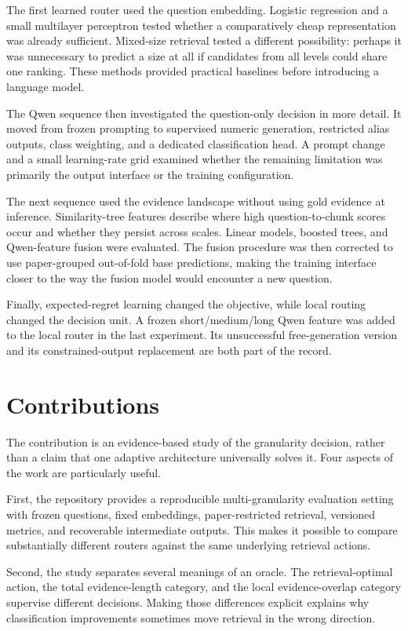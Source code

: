 The first learned router used the question embedding. Logistic regression
and a small multilayer perceptron tested whether a comparatively cheap
representation was already sufficient. Mixed-size retrieval tested a
different possibility: perhaps it was unnecessary to predict a size at
all if candidates from all levels could share one ranking. These methods
provided practical baselines before introducing a language model.

The Qwen sequence then investigated the question-only decision in more
detail. It moved from frozen prompting to supervised numeric generation,
restricted alias outputs, class weighting, and a dedicated classification
head. A prompt change and a small learning-rate grid examined whether
the remaining limitation was primarily the output interface or the
training configuration.

The next sequence used the evidence landscape without using gold
evidence at inference. Similarity-tree features describe where high
question-to-chunk scores occur and whether they persist across scales.
Linear models, boosted trees, and Qwen-feature fusion were evaluated.
The fusion procedure was then corrected to use paper-grouped out-of-fold
base predictions, making the training interface closer to the way the
fusion model would encounter a new question.

Finally, expected-regret learning changed the objective, while local
routing changed the decision unit. A frozen short/medium/long Qwen feature
was added to the local router in the last experiment. Its unsuccessful
free-generation version and its constrained-output replacement are both
part of the record.

\section{Contributions}
The contribution is an evidence-based study of the granularity decision,
rather than a claim that one adaptive architecture universally solves it.
Four aspects of the work are particularly useful.

First, the repository provides a reproducible multi-granularity evaluation
setting with frozen questions, fixed embeddings, paper-restricted retrieval,
versioned metrics, and recoverable intermediate outputs. This makes it
possible to compare substantially different routers against the same
underlying retrieval actions.

Second, the study separates several meanings of an oracle. The
retrieval-optimal action, the total evidence-length category, and the
local evidence-overlap category supervise different decisions. Making
those differences explicit explains why classification improvements
sometimes move retrieval in the wrong direction.


